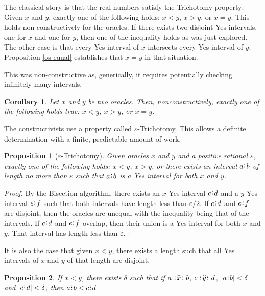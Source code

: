 \documentclass[12pt]{article}
\newtheorem{corollary}{Corollary}[section]
\newtheorem{proposition}{Proposition}[section]
\begin{document}
The classical story is that the real numbers satisfy the Trichotomy property:  Given $x$ and $y$, exactly one of the following holds:  $x<y$, $x>y$, or $x=y$. This holds non-constructively for the oracles. If there exists two disjoint Yes intervals, one for $x$ and one for $y$, then one of the inequality holds as was just explored. The other case is that every Yes interval of $x$ intersects every Yes interval of $y$. Proposition \ref{os-equal} establishes that $x=y$ in that situation. 
 

This was non-constructive as, generically, it requires potentially checking infinitely many intervals. 

\begin{corollary}
    Let $x$ and $y$ be two oracles. Then, nonconstructively, exactly one of the following holds true:  $x<y$, $x>y$, or $x=y$.
\end{corollary}

The constructivists use a property called $\varepsilon$-Trichotomy. This allows a definite determination with a finite, predictable amount of work. 

\begin{proposition}[$\varepsilon$-Trichotomy]
    Given oracles $x$ and $y$ and a positive rational $\varepsilon$, exactly one of the following holds:  $x<y$, $x>y$, or there exists an interval $a\rint b$ of length no more than $\varepsilon$ such that $a\rint b$ is a Yes interval for both $x$ and $y$.
\end{proposition}

\begin{proof}
    By the Bisection algorithm, there exists an $x$-Yes interval $c\rint d$ and a $y$-Yes interval $e\rint f$ such that both intervals have length less than $\varepsilon/2$. If $c\rint d$ and $e\rint f$ are disjoint, then the oracles are unequal with the inequality being that of the intervals. If $c\rint d$ and $e\rint f$ overlap, then their union is a Yes interval for both $x$ and $y$. That interval has length less than $\varepsilon$.
\end{proof}

It is also the case that given $x < y$, there exists a length such that all Yes intervals of $x$ and $y$ of that length are disjoint. 

\begin{proposition}
    If $ x< y$, there exists $\delta$ such that if $a \xora b$, $c \xora[y] d$, $|a\rint b| < \delta$ and $|c\rint d| < \delta$, then $a\rint b < c\rint d$
\end{proposition}
\end{document}
